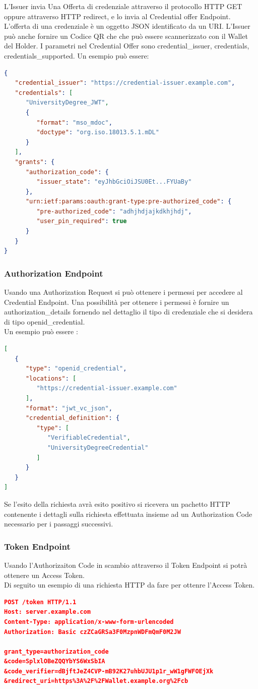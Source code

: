 L'Issuer invia Una Offerta di credenziale attraverso il protocollo HTTP GET oppure attraverso HTTP redirect, e lo invia al Credential offer Endpoint.
L'offerta di una credenziale è un oggetto JSON identificato da un URI.
L'Issuer può anche fornire un Codice QR che che può essere scannerizzato con il Wallet del Holder.
I parametri nel Credential Offer sono credential\_issuer, credentials, credentials\_supported.
Un esempio può essere:
\begin{lstlisting}[language=json,firstnumber=1]
{
   "credential_issuer": "https://credential-issuer.example.com",
   "credentials": [
      "UniversityDegree_JWT",
      {
         "format": "mso_mdoc",
         "doctype": "org.iso.18013.5.1.mDL"
      }
   ],
   "grants": {
      "authorization_code": {
         "issuer_state": "eyJhbGciOiJSU0Et...FYUaBy"
      },
      "urn:ietf:params:oauth:grant-type:pre-authorized_code": {
         "pre-authorized_code": "adhjhdjajkdkhjhdj",
         "user_pin_required": true
      }
   }
}
\end{lstlisting}

\subsubsection{Authorization Endpoint}
Usando una Authorization Request si può ottenere i permessi per accedere al Credential Endpoint.
Una possibilità per ottenere i permessi è fornire un authorization\_details fornendo nel dettaglio il tipo di credenziale che si desidera
di tipo openid\_credential.\\
Un esempio può essere :
\begin{lstlisting}[language=json,firstnumber=1]
[
   {
      "type": "openid_credential",
      "locations": [
         "https://credential-issuer.example.com"
      ],
      "format": "jwt_vc_json",
      "credential_definition": {
         "type": [
            "VerifiableCredential",
            "UniversityDegreeCredential"
         ]
      }
   }
]
\end{lstlisting}
Se l'esito della richiesta avrà esito positivo si ricevera un pachetto HTTP contenente i dettagli sulla 
richiesta effettuata insieme ad un Authorization Code necessario per i passaggi successivi.
\subsubsection{Token Endpoint}
Usando l'Authorizaiton Code in scambio attraverso il Token Endpoint si potrà ottenere un Access Token.\\
Di seguito un esempio di una richiesta HTTP da fare per ottenre l'Access Token.
\begin{lstlisting}[language=json,firstnumber=1]
POST /token HTTP/1.1
Host: server.example.com
Content-Type: application/x-www-form-urlencoded
Authorization: Basic czZCaGRSa3F0MzpnWDFmQmF0M2JW

grant_type=authorization_code
&code=SplxlOBeZQQYbYS6WxSbIA
&code_verifier=dBjftJeZ4CVP-mB92K27uhbUJU1p1r_wW1gFWFOEjXk
&redirect_uri=https%3A%2F%2FWallet.example.org%2Fcb
\end{lstlisting}

